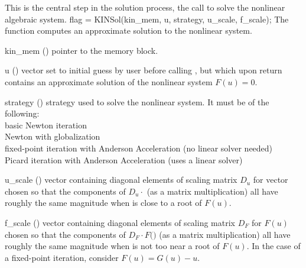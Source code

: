 This is the central step in the solution process, the call to solve
the nonlinear algebraic system.
%
{
  flag = KINSol(kin\_mem, u, strategy, u\_scale, f\_scale);
}
{
  The function  computes an approximate solution to the nonlinear
  system.
}
{
  \begin{args}[strategy]
  \item[kin\_mem] ()
    pointer to the {\kinsol} memory block.
  \item[u] ()
    vector set to initial guess by user before calling ,
    but which upon return contains an approximate solution of
    the nonlinear system $F(u) = 0$.
  \item[strategy] ()
    strategy used to solve the nonlinear system. It must be of the following: \\
      basic Newton iteration \\
     Newton with globalization \\
     fixed-point iteration with Anderson Acceleration
                 (no linear solver needed)\\
     Picard iteration with Anderson Acceleration
                     (uses a linear solver)\\
  \item[u\_scale] ()
    vector containing diagonal elements of scaling matrix $D_u$ for vector 
    chosen so that the components of $D_u \cdot$
    (as a matrix multiplication) all have roughly the same magnitude when
     is close to a root of $F(u)$.
  \item[f\_scale] ()
    vector containing diagonal elements of scaling matrix $D_F$ for $F(u)$ chosen
    so that the components of $D_F \cdot F($$)$
    (as a matrix multiplication) all have roughly the same magnitude when
     is not too near a root of $F(u)$. In the case of a fixed-point
    iteration, consider $F(u) = G(u) - u$.
  \end{args}
}
